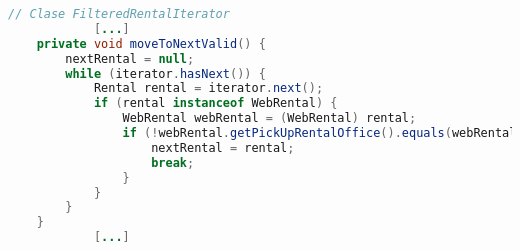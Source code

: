 \begin{lstlisting}[style = javaEspecifico, language=Java]
 // Clase FilteredRentalIterator
            [...]
    private void moveToNextValid() {
        nextRental = null;
        while (iterator.hasNext()) {
            Rental rental = iterator.next();
            if (rental instanceof WebRental) {
                WebRental webRental = (WebRental) rental;
                if (!webRental.getPickUpRentalOffice().equals(webRental.getDeliveryRentalOffice())) {
                    nextRental = rental;
                    break;
                }
            }
        }
    }
            [...]
\end{lstlisting}